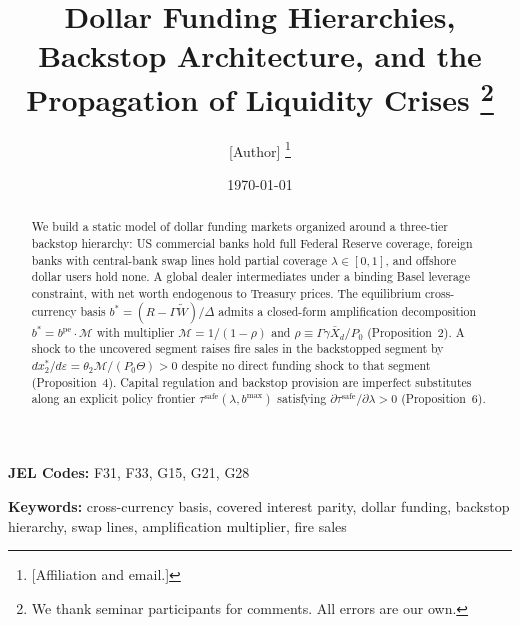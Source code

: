 \documentclass[12pt]{article}
\title{Dollar Funding Hierarchies, Backstop Architecture, and the
  Propagation of Liquidity Crises%
  \thanks{We thank seminar participants for comments. All errors are our own.}}
\author{[Author]%
  \thanks{[Affiliation and email.]}}
\date{\today}
\newcommand{\1}[1]{\mathds{1}\left[#1\right]}
\begin{document}

\maketitle
\thispagestyle{empty}

\begin{abstract}
\noindent \singlespacing
We build a static model of dollar funding markets organized around a three-tier backstop hierarchy:
US commercial banks hold full Federal Reserve coverage, foreign banks with central-bank swap lines
hold partial coverage $\lambda \in [0,1]$, and offshore dollar users hold none. A global dealer
intermediates under a binding Basel leverage constraint, with net worth endogenous to Treasury
prices. The equilibrium cross-currency basis $b^* = (R - \Gamma\tilde{W})/\Delta$ admits a closed-form
amplification decomposition $b^* = b^{\mathrm{pe}} \cdot \mathcal{M}$ with multiplier $\mathcal{M} = 1/(1-\rho)$
and $\rho \equiv \Gamma\gamma\bar{X}_d/P_0$ (Proposition~2). A shock to the uncovered segment raises
fire sales in the backstopped segment by $dx_2^*/d\varepsilon = \theta_2\mathcal{M}/(P_0\Theta) > 0$
despite no direct funding shock to that segment (Proposition~4). Capital regulation and backstop
provision are imperfect substitutes along an explicit policy frontier $\tau^{\mathrm{safe}}(\lambda,
b^{\max})$ satisfying $\partial\tau^{\mathrm{safe}}/\partial\lambda > 0$ (Proposition~6).
\end{abstract}

\vspace{1em}
\noindent \textbf{JEL Codes:} F31, F33, G15, G21, G28

\vspace{0.5em}
\noindent \textbf{Keywords:} cross-currency basis, covered interest parity, dollar funding,
backstop hierarchy, swap lines, amplification multiplier, fire sales

\newpage
\setcounter{page}{1}






\end{document}
